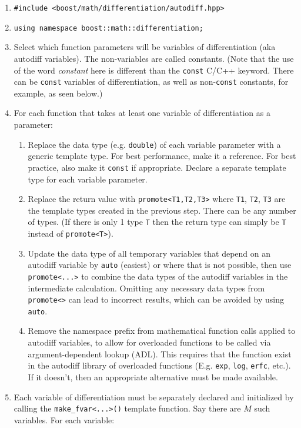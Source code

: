 \documentclass{article}
\begin{document}
\begin{enumerate}
\item {\tt \#include <boost/math/differentiation/autodiff.hpp>}
\item {\tt using namespace boost::math::differentiation;}
\item Select which function parameters will be variables of differentiation (aka autodiff variables). The
  non-variables are called constants. (Note that the use of the word {\it constant}\/ here is different than the
  {\tt const} C/C++ keyword. There can be {\tt const} variables of differentiation, as well as non-{\tt const}
  constants, for example, as seen below.)
\item For each function that takes at least one variable of differentiation as a parameter:
  \begin{enumerate}
  \item Replace the data type (e.g. {\tt double}) of each variable parameter with a generic template type.
    For best performance, make it a reference. For best practice, also make it {\tt const} if appropriate.
    Declare a separate template type for each variable parameter.
  \item Replace the return value with {\tt promote<T1,T2,T3>} where {\tt T1}, {\tt T2}, {\tt T3} are the template
    types created in the previous step. There can be any number of types. (If there is only 1 type {\tt T} then the
    return type can simply be {\tt T} instead of {\tt promote<T>}).
  \item Update the data type of all temporary variables that depend on an autodiff variable by {\tt auto} (easiest)
    or where that is not possible, then use {\tt promote<...>} to combine the data types of the autodiff variables
    in the intermediate calculation. Omitting any necessary data types from {\tt promote<>} can lead to incorrect
    results, which can be avoided by using {\tt auto}.
  \item Remove the namespace prefix from mathematical function calls applied to autodiff variables, to allow
    for overloaded functions to be called via argument-dependent lookup (ADL). This requires that the function exist
    in the autodiff library of overloaded functions (E.g. {\tt exp}, {\tt log}, {\tt erfc}, etc.). If it doesn't,
    then an appropriate alternative must be made available.
  \end{enumerate}
\item Each variable of differentiation must be separately declared and initialized by calling the
  {\tt make\_fvar<...>()} template function. Say there are $M$ such variables. For each variable:

\end{enumerate}
\end{document}
